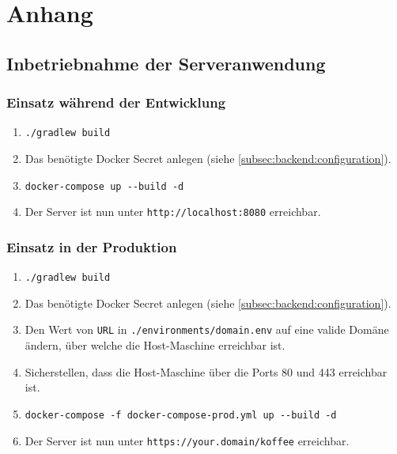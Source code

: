 \section*{Anhang}
\label{sec:attachments}

\subsection*{Inbetriebnahme der Serveranwendung}
\label{subsec:attachments:instructions}

\subsubsection*{Einsatz während der Entwicklung}
\label{subsubsec:attachments:instructions:development}
\begin{enumerate}
	\item \verb|./gradlew build|
	\item Das benötigte Docker Secret anlegen (siehe \autoref{subsec:backend:configuration}).
	\item \verb|docker-compose up --build -d|
	\item Der Server ist nun unter \verb|http://localhost:8080| erreichbar.
\end{enumerate}

\subsubsection*{Einsatz in der Produktion}
\label{subsubsec:attachments:instructions:production}
\begin{enumerate}
	\item \verb|./gradlew build|
	\item Das benötigte Docker Secret anlegen (siehe \autoref{subsec:backend:configuration}).
	\item Den Wert von \verb|URL| in \verb|./environments/domain.env| auf eine valide Domäne ändern, über welche die Host-Maschine erreichbar ist.
	\item Sicherstellen, dass die Host-Maschine über die Ports 80 und 443 erreichbar ist.
	\item \verb|docker-compose -f docker-compose-prod.yml up --build -d|
	\item Der Server ist nun unter \verb|https://your.domain/koffee| erreichbar.
\end{enumerate}

